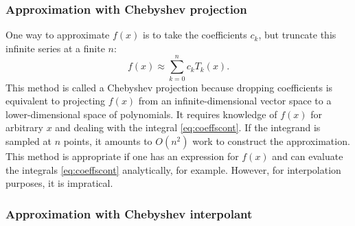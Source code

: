 \documentclass{aa}
\begin{document}
\subsubsection{Approximation with Chebyshev projection}

One way to approximate $f(x)$ is to take the coefficients $c_k$, but truncate this infinite series at a finite $n$:
\begin{equation}
	f(x) \approx \sum_{k=0}^n c_k T_k(x).
\label{eq:projection}
\end{equation}
This method is called a Chebyshev projection because dropping coefficients is equivalent to projecting $f(x)$ from an infinite-dimensional vector space to a lower-dimensional space of polynomials.
It requires knowledge of $f(x)$ for arbitrary $x$ and dealing with the integral \eqref{eq:coeffscont}.
If the integrand is sampled at $n$ points, it amounts to $O(n^2)$ work to construct the approximation.
This method is appropriate if one has an expression for $f(x)$ and can evaluate the integrals \eqref{eq:coeffscont} analytically, for example.
However, for interpolation purposes, it is impratical.

\subsubsection{Approximation with Chebyshev interpolant}
\end{document}
